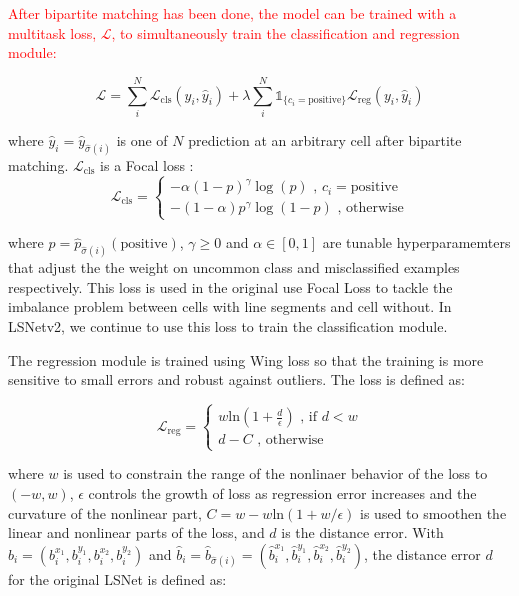 \documentclass[journal]{IEEEtran}
\begin{document}
\textcolor{red}{After bipartite matching has been done, the model can be trained with a multitask loss, $\mathcal{L}$, to simultaneously train the classification and regression module:}

\begin{equation} \label{multitask_training_loss}
\mathcal{L} = \sum_i^N\mathcal{L}_{\text{cls}}(y_i, \hat{y}_i) + \lambda \sum_i^N\mathds{1}_{\{c_i=\text{positive}\}}\mathcal{L}_\text{reg}(y_i, \hat{y}_i) 
\end{equation}

where $\hat{y}_i = \hat{y}_{\hat{\sigma}(i)}$ is one of $N$ prediction at an arbitrary cell after bipartite matching. $\mathcal{L}_{\text{cls}}$ is a Focal loss \cite{focal_loss}:
\begin{equation}
  \mathcal{L}_{\text{cls}} =
    \begin{cases}
      -\alpha (1 - p)^\gamma \log(p) \text{  ,  } c_i=\text{positive} \\
      -(1 - \alpha)p^\gamma \log(1-p) \text{  , otherwise} 
    \end{cases}       
\end{equation}

where $p=\hat{p}_{\hat{\sigma}(i)}(\text{positive})$, $\gamma \geq 0$ and $\alpha \in [0, 1]$ are tunable hyperparamemters that adjust the the weight on uncommon class and misclassified examples respectively. This loss is used in the original use Focal Loss to tackle the imbalance problem between cells with line segments and cell without. In LSNetv2, we continue to use this loss to train the classification module.

The regression module is trained using Wing loss \cite{wing_loss} so that the training is more sensitive to small errors and robust against outliers. The loss is defined as:

\begin{equation}
  \mathcal{L}_{\text{reg}} =
    \begin{cases}
      w \text{ln} (1 + \frac{d}{\epsilon}) \text{  , if  } d < w \\
      d - C \text{  , otherwise}
    \end{cases}       
\end{equation}

where $w$ is used to constrain the range of the nonlinaer behavior of the loss to $(-w, w)$, $\epsilon$ controls the growth of loss as regression error increases and the curvature of the nonlinear part, $C = w - w\text{ln}(1 + w / \epsilon)$ is used to smoothen the linear and nonlinear parts of the loss, and $d$ is the distance error. With $b_i = (b_i^{x_1}, b_i^{y_1}, b_i^{x_2}, b_i^{y_2})$ and $\hat{b}_i = \hat{b}_{\hat{\sigma}(i)} = (\hat{b}_i^{x_1}, \hat{b}_i^{y_1}, \hat{b}_i^{x_2}, \hat{b}_i^{y_2})$, the distance error $d$ for the original LSNet is defined as:
\end{document}
